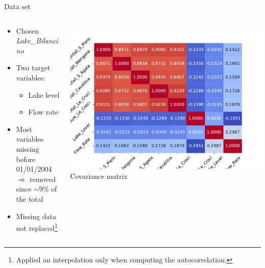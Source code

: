 \documentclass[aspectratio=169, glossy]{beamer}
\begin{document}
\begin{frame}{Data set}
  \begin{columns}
    \begin{column}{0.6\columnwidth}
      \begin{itemize}
        \item Chosen \textit{Lake\_Bilancino}
        \item Two target variables:
          \begin{itemize}
            \item Lake level
            \item Flow rate
          \end{itemize}
        \item Most variables missing before 01/01/2004\\
        $\Rightarrow$ removed since $\sim 9\%$ of the total
        \item Missing data not replaced\footnote{Applied an interpolation only when computing the autocorrelation.}
      \end{itemize}
      \vspace{7em}
    \end{column}
    \begin{column}{0.4\columnwidth}
      \begin{center}
        \includegraphics[width=0.8\columnwidth]{../plots/corr_vars.pdf}\\
        \tiny{Covariance matrix}
      \end{center}
    \end{column}
  \end{columns}
\end{frame}

\end{document}
